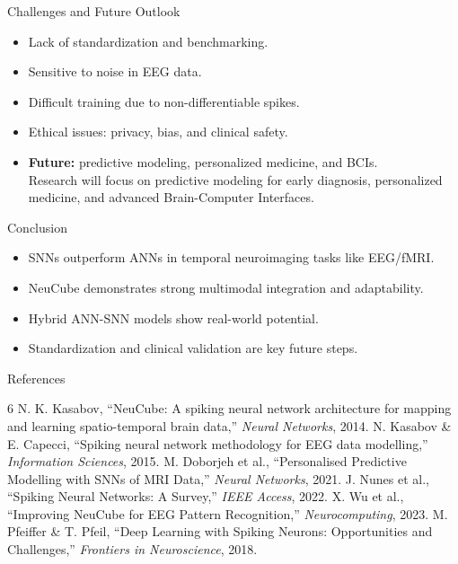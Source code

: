 \documentclass{beamer}
\begin{document}
\begin{frame}{Challenges and Future Outlook}
\begin{itemize}
  \item Lack of standardization and benchmarking.
  \item Sensitive to noise in EEG data.
  \item Difficult training due to non-differentiable spikes.
  \item Ethical issues: privacy, bias, and clinical safety.
  \item \textbf{Future:} predictive modeling, personalized medicine, and BCIs.\\
  \medskip
  Research will focus on predictive modeling for early diagnosis, personalized medicine, and advanced Brain-Computer Interfaces.

\end{itemize}
\end{frame}

\begin{frame}{Conclusion}
\begin{itemize}
  \item SNNs outperform ANNs in temporal neuroimaging tasks like EEG/fMRI.
  \item NeuCube demonstrates strong multimodal integration and adaptability.
  \item Hybrid ANN-SNN models show real-world potential.
  \item Standardization and clinical validation are key future steps.
\end{itemize}
\end{frame}

\begin{frame}{References}
\scriptsize
\begin{thebibliography}{6}
 N. K. Kasabov, ``NeuCube: A spiking neural network architecture for mapping and learning spatio-temporal brain data,'' \textit{Neural Networks}, 2014.
 N. Kasabov \& E. Capecci, ``Spiking neural network methodology for EEG data modelling,'' \textit{Information Sciences}, 2015.
 M. Doborjeh et al., ``Personalised Predictive Modelling with SNNs of MRI Data,'' \textit{Neural Networks}, 2021.
 J. Nunes et al., ``Spiking Neural Networks: A Survey,'' \textit{IEEE Access}, 2022.
 X. Wu et al., ``Improving NeuCube for EEG Pattern Recognition,'' \textit{Neurocomputing}, 2023.
 M. Pfeiffer \& T. Pfeil, ``Deep Learning with Spiking Neurons: Opportunities and Challenges,'' \textit{Frontiers in Neuroscience}, 2018.
\end{thebibliography}
\end{frame}
\end{document}
